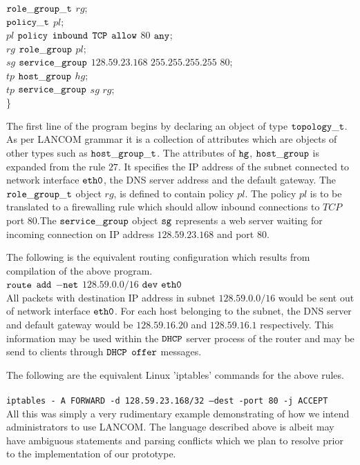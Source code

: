   \indent ${\tt role\_group\_t}$ $rg$;\\
  \indent ${\tt policy\_t}$ $pl$;\\
  \indent ${pl}$ ${\tt policy}$ ${\tt inbound}$ ${\tt TCP}$ ${\tt allow}$ $80$ ${\tt any}$;\\
  \indent ${rg}$ ${\tt role\_group}$ $pl$;\\
  \indent ${sg}$ ${\tt service\_group}$ $128.59.23.168$ $255.255.255.255$ $80$;\\
  \indent ${tp}$ ${\tt host\_group}$ $hg$;\\
  \indent ${tp}$ ${\tt service\_group}$ $sg$ $rg$;\\

\}


    The first line of the program begins by declaring an object of type ${\tt topology\_t}$.
    As per LANCOM grammar it is a collection of attributes which are objects of other types such 
    as ${\tt host\_group\_t}$. The attributes of ${\tt hg}$, ${\tt host\_group}$ is expanded from
    the rule $27$. It specifies the IP address of the subnet connected to network interface
    ${\tt eth0}$, the DNS server address and the default gateway. The ${\tt role\_group\_t}$ 
    object $rg$, is defined to contain policy $pl$. The policy $pl$ is to be translated to a 
    firewalling rule which should allow inbound connections to $TCP$ port $80$.The ${\tt service\_group}$
    object ${\tt sg}$ represents a web server waiting for incoming connection on IP 
    address $128.59.23.168$ and port $80$.

    The following is the equivalent routing configuration which results from
    compilation of the above program.\\ 

\noindent ${\tt route}$ ${\tt add}$ ${\tt -net}$ $128.59.0.0/16$ ${\tt dev}$ ${\tt eth0}$ \\

    All packets with destination IP address in subnet $128.59.0.0/16$ would be sent out of 
    network interface ${\tt eth0}$. For each host belonging to the subnet, the DNS server and
    default gateway would be $128.59.16.20$ and $128.59.16.1$ respectively. This information 
    may be used within the ${\tt DHCP} $ server process of the router and may be send to clients 
    through ${\tt DHCP}$ ${\tt offer}$ messages.

    The following are the equivalent Linux 'iptables' commands for the above
    rules. \\

 \\
           {\tt iptables - A FORWARD -d 128.59.23.168/32 --dest -port 80 -j ACCEPT} \\
          
          All this was simply a very rudimentary example demonstrating of how we intend administrators to use 
          LANCOM. The language described above is albeit may have ambiguous statements and parsing conflicts which we 
          plan to resolve prior to the implementation of our prototype.
